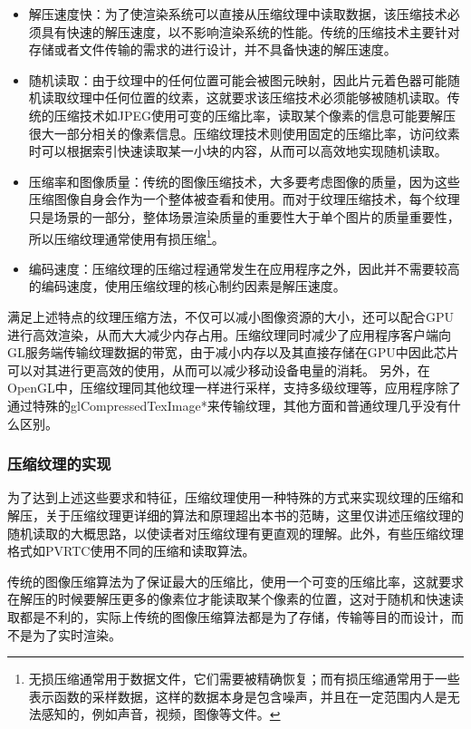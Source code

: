\begin{itemize}
	\item 解压速度快：为了使渲染系统可以直接从压缩纹理中读取数据，该压缩技术必须具有快速的解压速度，以不影响渲染系统的性能。传统的压缩技术主要针对存储或者文件传输的需求的进行设计，并不具备快速的解压速度。
	\item 随机读取：由于纹理中的任何位置可能会被图元映射，因此片元着色器可能随机读取纹理中任何位置的纹素，这就要求该压缩技术必须能够被随机读取。传统的压缩技术如JPEG使用可变的压缩比率，读取某个像素的信息可能要解压很大一部分相关的像素信息。压缩纹理技术则使用固定的压缩比率，访问纹素时可以根据索引快速读取某一小块的内容，从而可以高效地实现随机读取。
	\item 压缩率和图像质量：传统的图像压缩技术，大多要考虑图像的质量，因为这些压缩图像自身会作为一个整体被查看和使用。而对于纹理压缩技术，每个纹理只是场景的一部分，整体场景渲染质量的重要性大于单个图片的质量重要性，所以压缩纹理通常使用有损压缩\footnote{无损压缩通常用于数据文件，它们需要被精确恢复；而有损压缩通常用于一些表示函数的采样数据，这样的数据本身是包含噪声，并且在一定范围内人是无法感知的，例如声音，视频，图像等文件。}。
	\item 编码速度：压缩纹理的压缩过程通常发生在应用程序之外，因此并不需要较高的编码速度，使用压缩纹理的核心制约因素是解压速度。

\end{itemize}

满足上述特点的纹理压缩方法，不仅可以减小图像资源的大小，还可以配合GPU进行高效渲染，从而大大减少内存占用。压缩纹理同时减少了应用程序客户端向GL服务端传输纹理数据的带宽，由于减小内存以及其直接存储在GPU中因此芯片可以对其进行更高效的使用，从而可以减少移动设备电量的消耗。 另外，在OpenGL中，压缩纹理同其他纹理一样进行采样，支持多级纹理等，应用程序除了通过特殊的glCompressedTexImage*来传输纹理，其他方面和普通纹理几乎没有什么区别。



\subsubsection{压缩纹理的实现}
为了达到上述这些要求和特征，压缩纹理使用一种特殊的方式来实现纹理的压缩和解压，关于压缩纹理更详细的算法和原理超出本书的范畴，这里仅讲述压缩纹理的随机读取的大概思路，以使读者对压缩纹理有更直观的理解。此外，有些压缩纹理格式如PVRTC使用不同的压缩和读取算法。

传统的图像压缩算法为了保证最大的压缩比，使用一个可变的压缩比率，这就要求在解压的时候要解压更多的像素位才能读取某个像素的位置，这对于随机和快速读取都是不利的，实际上传统的图像压缩算法都是为了存储，传输等目的而设计，而不是为了实时渲染。

